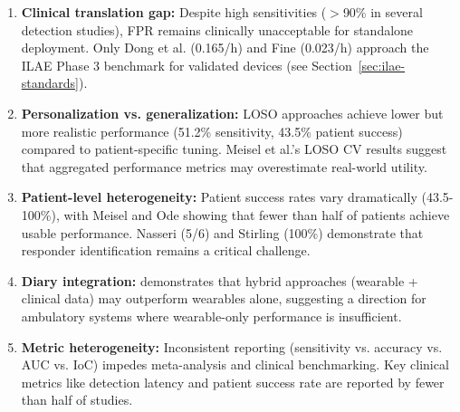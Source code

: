 \begin{enumerate}
  \item \textbf{Clinical translation gap:} Despite high sensitivities ($>$90\% in several detection studies), FPR remains clinically unacceptable for standalone deployment. Only Dong et al. (0.165/h) and Fine (0.023/h) approach the ILAE Phase 3 benchmark for validated devices (see Section~\ref{sec:ilae-standards}).

  \item \textbf{Personalization vs. generalization:} LOSO approaches achieve lower but more realistic performance (51.2\% sensitivity, 43.5\% patient success) compared to patient-specific tuning. Meisel et al.'s LOSO CV results suggest that aggregated performance metrics may overestimate real-world utility.

  \item \textbf{Patient-level heterogeneity:} Patient success rates vary dramatically (43.5-100\%), with Meisel and Ode showing that fewer than half of patients achieve usable performance. Nasseri (5/6) and Stirling (100\%) demonstrate that responder identification remains a critical challenge.

  \item \textbf{Diary integration:} \parencite{vielufSeizureMonitoringCombined2025} demonstrates that hybrid approaches (wearable + clinical data) may outperform wearables alone, suggesting a direction for ambulatory systems where wearable-only performance is insufficient.

  \item \textbf{Metric heterogeneity:} Inconsistent reporting (sensitivity vs. accuracy vs. AUC vs. IoC) impedes meta-analysis and clinical benchmarking. Key clinical metrics like detection latency and patient success rate are reported by fewer than half of studies.
\end{enumerate}

